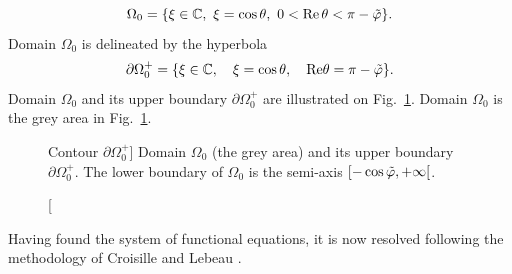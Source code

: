 \begin{equation}
\label{Domain_Omega0}
\Omega_0 =\{\xi\in\mathbb C, \ \xi=\cos \theta, \ 0< {\rm Re } \, \theta < \pi -\tilde{\varphi} \}.
\end{equation}
Domain $\Omega_0$ is delineated by the hyperbola 
\begin{equation}
\partial \Omega_0^+ = \{   \xi \in \mathbb{C}, \quad \xi = \cos \theta, \quad {\rm Re}  \theta = \pi - \tilde{\varphi} \}.
\end{equation}
Domain $\Omega_0$ and its upper boundary $\partial \Omega_0^+$ are illustrated on Fig.~\ref{chapter5:figure4}. Domain $\Omega_0$ is the grey area in Fig.~\ref{chapter5:figure4}.

\begin{figure}[h]
\centering
{}
\caption
[Contour $\partial \Omega_0^+$]
{Domain $\Omega_0$ (the grey area) and its upper boundary $\partial \Omega_0^+$. The lower boundary of $\Omega_0$ is the semi-axis $[-\cos \tilde{\varphi},+\infty[$.}
\label{chapter5:figure4}
\end{figure}
Having found the system of functional equations, it is now resolved following the methodology of Croisille and Lebeau \cite{CroisilleLebeau}.

